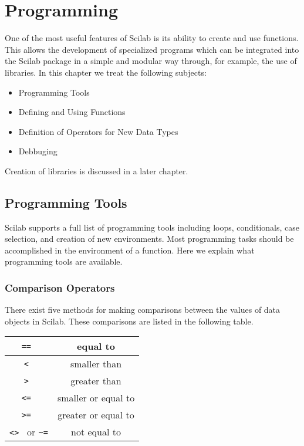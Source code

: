 
\chapter{Programming}
\label{ch4}

	One of the most useful features of Scilab is its ability
to create and use functions.  This allows the development of specialized
programs which can be integrated into the Scilab package in a simple and
modular way through, for example, the use of libraries.  In this chapter we 
treat the following subjects:
\begin{itemize}
	\item Programming Tools
	\item Defining and Using Functions
        \item Definition of Operators for New Data Types
	\item{Debbuging}
\end{itemize}	
Creation of libraries is discussed in a later chapter.

\section{Programming Tools}

	Scilab supports a full list of programming tools
including loops, conditionals, case selection,
and creation of new environments.  Most programming tasks
should be accomplished in the environment of a function.
Here we explain what programming tools are available.

\subsection{Comparison Operators}
There exist five methods for making comparisons between the
values of data objects in Scilab. These comparisons are listed
in the following table.

\begin{center}
\begin{tabular}{|c|c|}
\hline
{\tt == }  & equal to \\ \hline
{\tt < } & smaller than \\ \hline
{\tt > } &  greater than \\ \hline
{\tt <= } & smaller or equal to \\ \hline
{\tt >= } & greater or equal to \\ \hline
{\tt <> } or {\verb!~=!} & not equal to \\ \hline
\end{tabular}
\end{center}

